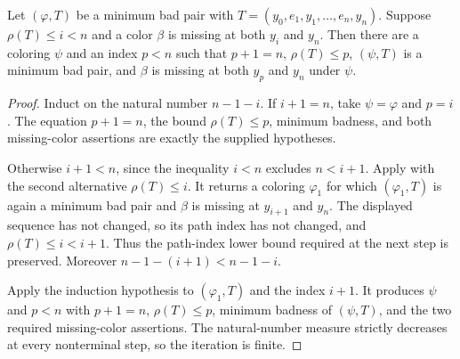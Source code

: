 \begin{helper}
Let \((\varphi,T)\) be a minimum bad pair with
\(T=(y_0,e_1,y_1,\ldots,e_n,y_n)\).  Suppose \(\rho(T)\leq i<n\)
and a color \(\beta\) is missing at both \(y_i\) and \(y_n\).  Then
there are a coloring \(\psi\) and an index \(p<n\) such that
\(p+1=n\), \(\rho(T)\leq p\), \((\psi,T)\) is a minimum bad pair,
and \(\beta\) is missing at both \(y_p\) and \(y_n\) under \(\psi\).
\end{helper}
\begin{proof}
Induct on the natural number \(n-1-i\).  If \(i+1=n\), take
\(\psi=\varphi\) and \(p=i\).  The equation \(p+1=n\), the bound
\(\rho(T)\leq p\), minimum badness, and both missing-color assertions
are exactly the supplied hypotheses.

Otherwise \(i+1<n\), since the inequality \(i<n\) excludes
\(n<i+1\).  Apply  with the second
alternative \(\rho(T)\leq i\).  It returns a coloring \(\varphi_1\)
for which \((\varphi_1,T)\) is again a minimum bad pair and \(\beta\)
is missing at \(y_{i+1}\) and \(y_n\).  The displayed sequence has not
changed, so its path index has not changed, and
\(\rho(T)\leq i<i+1\).  Thus the path-index lower bound required at
the next step is preserved.  Moreover
\(n-1-(i+1)<n-1-i\).

Apply the induction hypothesis to \((\varphi_1,T)\) and the index
\(i+1\).  It produces \(\psi\) and \(p<n\) with \(p+1=n\),
\(\rho(T)\leq p\), minimum badness of \((\psi,T)\), and the two
required missing-color assertions.  The natural-number measure strictly
decreases at every nonterminal step, so the iteration is finite.
\end{proof}
